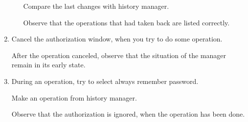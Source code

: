 \documentclass[a4paper,10pt]{article}
\begin{document}
\begin{enumerate}
\begin{enumerate}
            Compare the last changes with history manager.

            Observe that the operations that had taken back are listed correctly.
\end{enumerate}

\item Cancel the authorization window, when you try to do some operation.

After the operation canceled, observe that the situation of the manager remain in its early state.

\item During an operation, try to select always remember password.

Make an operation from history manager.

Observe that the authorization is ignored, when the operation has been done.
\end{enumerate}

\end{document}

